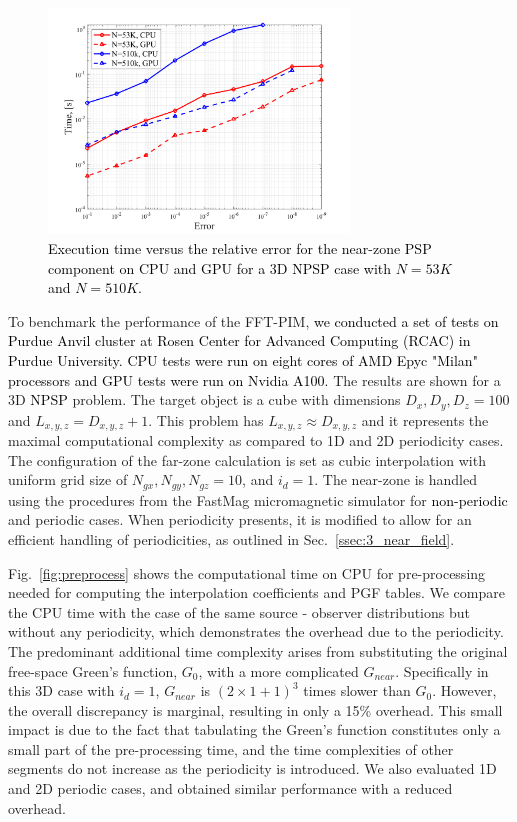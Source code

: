 \documentclass{article}
\begin{document}
\begin{figure}[htbp] 
\includegraphics[width=8cm]{error_perf.png}
\centering
\caption{\textcolor{black}{Execution time versus the relative error for the near-zone PSP component on CPU and GPU for a \textcolor{black}{3D NPSP} case with $N=53K$ and $N=510K$.}} \label{fig:error_perf}
\end{figure}

To benchmark the performance of the FFT-PIM, \textcolor{black}{we conducted a set of tests on Purdue
Anvil cluster at Rosen Center for Advanced Computing (RCAC) in Purdue University. CPU tests were run on eight cores of AMD Epyc "Milan" processors and GPU tests were run on Nvidia A100.} The results are shown for a 3D  \textcolor{black}{NPSP} problem. The target object is a cube with dimensions $D_x,D_y,D_z=100$ and $L_{x,y,z}=D_{x,y,z}+1$. This problem has $L_{x,y,z}\approx D_{x,y,z}$ and it represents the maximal computational complexity as compared to 1D and 2D periodicity cases. The configuration of the far-zone calculation is set as cubic interpolation with uniform grid size of $N_{gx},N_{gy},N_{gz}=10$, and $i_d = 1$. The near-zone is handled using the procedures from the FastMag micromagnetic simulator \cite{Fastmag, 6348120} for \textcolor{black}{non-periodic} and periodic cases. When periodicity presents, it is modified to allow for an efficient handling of periodicities, as outlined in Sec.~\ref{ssec:3_near_field}.

Fig.~\ref{fig:preprocess} shows the computational time on CPU for pre-processing needed for computing the interpolation coefficients and PGF tables. We compare the CPU time with the case of the same source - observer distributions but without any periodicity, which demonstrates the overhead due to the periodicity. The predominant additional time complexity arises from substituting the original free-space Green's function, $G_0$, with a more complicated $G_{near}$. Specifically in this 3D case with $i_d=1$, $G_{near}$ is $(2\times1+1)^3$ times slower than $G_0$. However, the overall discrepancy is marginal, resulting in only a 15\% overhead. This small impact is due to the fact that tabulating the Green's function constitutes only a small part of the pre-processing time, and the time complexities of other segments do not increase as the periodicity is introduced. We also evaluated 1D and 2D periodic cases, and obtained similar performance with a reduced overhead.
\end{document}
